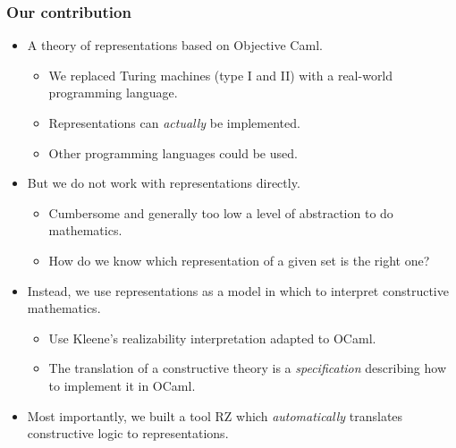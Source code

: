 \documentclass[t]{beamer}
\begin{document}
\begin{frame}
  \frametitle{Our contribution}

  \begin{itemize}
  \item A theory of representations based on Objective Caml.
    \begin{itemize}[<.->]
    \item We replaced Turing machines (type I and II) with a
      real-world programming language.
    \item Representations can \emph{actually} be implemented.
    \item Other programming languages could be used.
    \end{itemize}
  \item But we do not work with representations directly.
    \begin{itemize}[<.->]
    \item Cumbersome and generally too low a level of abstraction to
      do mathematics.
    \item How do we know which representation of a given set is the
      right one?
    \end{itemize}
  \item Instead, we use representations as a model in which to
    interpret constructive mathematics.
    \begin{itemize}[<.->]
    \item Use Kleene's realizability interpretation adapted to OCaml.
    \item The translation of a constructive theory is a
      \emph{specification} describing how to implement it in OCaml.
    \end{itemize}
  \item Most importantly, we built a tool RZ which
    \emph{automatically} translates constructive logic to representations.
  \end{itemize}
\end{frame}
\end{document}
